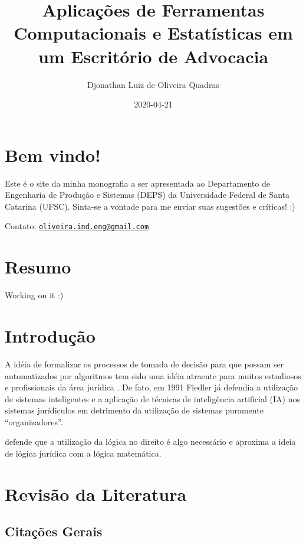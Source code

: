 \documentclass[
]{book}
\title{Aplicações de Ferramentas Computacionais e Estatísticas em um Escritório de Advocacia}
\author{Djonathan Luiz de Oliveira Quadras}
\date{2020-04-21}
\begin{document}
\maketitle

{
\setcounter{tocdepth}{1}
\tableofcontents
}
\hypertarget{bem-vindo}{%
\chapter*{Bem vindo!}\label{bem-vindo}}

Este é o site da minha monografia a ser apresentada ao Departamento de Engenharia de Produção e Sistemas (DEPS) da Universidade Federal de Santa Catarina (UFSC). Sinta-se a vontade para me enviar suas sugestões e críticas! :)

Contato: \href{mailto:oliveira.ind.eng@gmail.com}{\nolinkurl{oliveira.ind.eng@gmail.com}}

\hypertarget{resumo}{%
\chapter*{Resumo}\label{resumo}}

Working on it :)

\hypertarget{introduuxe7uxe3o}{%
\chapter{Introdução}\label{introduuxe7uxe3o}}

A idéia de formalizar os processos de tomada de decisão para que possam ser automatizados por algoritmos tem sido uma idéia atraente para muitos estudiosos e profissionais da área jurídica \citep{Waltl2018}. De fato, em 1991 Fiedler já defendia a utilização de sistemas inteligentes e a aplicação de técnicas de inteligência artificial (IA) nos sistemas jurídiculos em detrimento da utilização de sistemas puramente ``organizadores''.

\citet{Fiedler1991} defende que a utilização da lógica no direito é algo necessário e aproxima a ideia de lógica jurídica com a lógica matemática.

\hypertarget{revisuxe3o-da-literatura}{%
\chapter{Revisão da Literatura}\label{revisuxe3o-da-literatura}}

\hypertarget{citauxe7uxf5es-gerais}{%
\section{Citações Gerais}\label{citauxe7uxf5es-gerais}}
\end{document}
